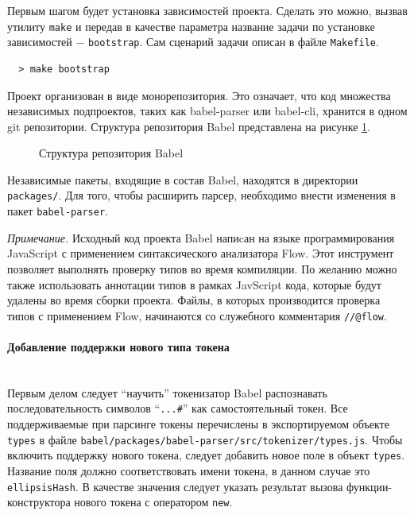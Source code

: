 \documentclass[14pt, a4paper]{article}
\def\code#1{\texttt{#1}} %
\begin{document}

Первым шагом будет установка зависимостей проекта. Сделать это можно, вызвав утилиту \code{make} и передав 
в качестве параметра название задачи по установке зависимостей $-$ \code{bootstrap}. Сам сценарий задачи 
описан в файле \code{Makefile}.

\begin{lstlisting}
  > make bootstrap
\end{lstlisting}

Проект организован в виде монорепозитория. Это означает, что код множества независимых подпроектов,
таких как babel-parser или babel-cli, хранится в одном git репозитории. Структура репозитория Babel
представлена на рисунке \ref{babel_dirs}.

\begin{figure}[H]
\centering
{}
\caption{Структура репозитория Babel}
\label{babel_dirs}
\end{figure}


Независимые пакеты, входящие в состав Babel, находятся в директории \code{packages/}. Для того, чтобы 
расширить парсер, необходимо внести изменения в пакет \code{babel-parser}.

\textit{Примечание.} Исходный код проекта Babel напиcан на языке программирования JavaScript с 
применением синтаксического анализатора Flow. Этот инструмент позволяет выполнять проверку типов во 
время компиляции. По желанию можно также использовать аннотации типов в рамках JavScript кода, которые
будут удалены во время сборки проекта. Файлы, в которых производится проверка типов с применением Flow,
начинаются со служебного комментария \code{//@flow}.

\paragraph{Добавление поддержки нового типа токена} \mbox{}\\

Первым делом следует ``научить'' токенизатор Babel распознавать последовательность символов ``\code{...\#}'' 
как самостоятельный токен. Все поддерживаемые при парсинге токены перечислены в экспортируемом объекте 
\code{types} в файле \code{babel/packages/babel-parser/src/tokenizer/types.js}. Чтобы включить поддержку нового токена,
следует добавить новое поле в объект \code{types}. Название поля должно соответствовать имени токена, в данном случае это \code{ellipsisHash}.
В качестве значения следует указать результат вызова функции-конструктора нового токена с оператором \code{new}. 
\end{document}
